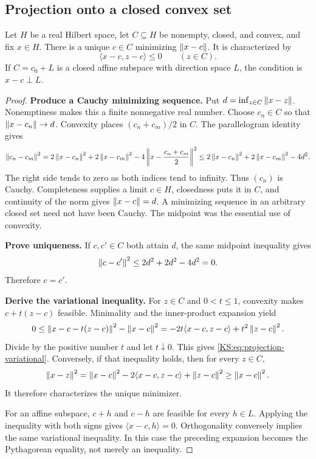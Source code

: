 \documentclass[11pt,oneside,openany]{book}
\numberwithin{equation}{section}
\begin{document}
\subsection{Projection onto a closed convex set}
\begin{KSlemma}\label{KS:lem:projection-tool}
Let \(H\) be a real Hilbert space, let \(C\subseteq H\) be nonempty, closed, and convex, and fix \(x\in H\). There is a unique \(c\in C\) minimizing \(\left\lVert x-c\right\rVert\). It is characterized by
\begin{equation}\label{KS:eq:projection-variational}
 \langle x-c,z-c\rangle\le0\qquad(z\in C).
\end{equation}
If \(C=c_0+L\) is a closed affine subspace with direction space \(L\), the condition is \(x-c\perp L\).
\end{KSlemma}
\begin{proof}
\textbf{Produce a Cauchy minimizing sequence.} Put \(d=\inf_{z\in C}\left\lVert x-z\right\rVert\). Nonemptiness makes this a finite nonnegative real number. Choose \(c_n\in C\) so that \(\left\lVert x-c_n\right\rVert\to d\). Convexity places \((c_n+c_m)/2\) in \(C\). The parallelogram identity gives
\[
 \left\lVert c_n-c_m\right\rVert^2
 =2\left\lVert x-c_n\right\rVert^2+2\left\lVert x-c_m\right\rVert^2
   -4\left\|x-\frac{c_n+c_m}{2}\right\|^2
 \le2\left\lVert x-c_n\right\rVert^2+2\left\lVert x-c_m\right\rVert^2-4d^2.
\]
The right side tends to zero as both indices tend to infinity. Thus \((c_n)\) is Cauchy. Completeness supplies a limit \(c\in H\), closedness puts it in \(C\), and continuity of the norm gives \(\left\lVert x-c\right\rVert=d\). A minimizing sequence in an arbitrary closed set need not have been Cauchy. The midpoint was the essential use of convexity.

\textbf{Prove uniqueness.} If \(c,c'\in C\) both attain \(d\), the same midpoint inequality gives
\[
 \left\lVert c-c'\right\rVert^2\le2d^2+2d^2-4d^2=0.
\]
Therefore \(c=c'\).

\textbf{Derive the variational inequality.} For \(z\in C\) and \(0<t\le1\), convexity makes \(c+t(z-c)\) feasible. Minimality and the inner-product expansion yield
\[
 0\le\left\lVert x-c-t(z-c)\right\rVert^2-\left\lVert x-c\right\rVert^2
   =-2t\langle x-c,z-c\rangle+t^2\left\lVert z-c\right\rVert^2.
\]
Divide by the positive number \(t\) and let \(t\downarrow0\). This gives \eqref{KS:eq:projection-variational}. Conversely, if that inequality holds, then for every \(z\in C\),
\[
 \left\lVert x-z\right\rVert^2
 =\left\lVert x-c\right\rVert^2-2\langle x-c,z-c\rangle+\left\lVert z-c\right\rVert^2
 \ge\left\lVert x-c\right\rVert^2.
\]
It therefore characterizes the unique minimizer.

For an affine subspace, \(c+h\) and \(c-h\) are feasible for every \(h\in L\). Applying the inequality with both signs gives \(\langle x-c,h\rangle=0\). Orthogonality conversely implies the same variational inequality. In this case the preceding expansion becomes the Pythagorean equality, not merely an inequality.
\end{proof}
\end{document}
